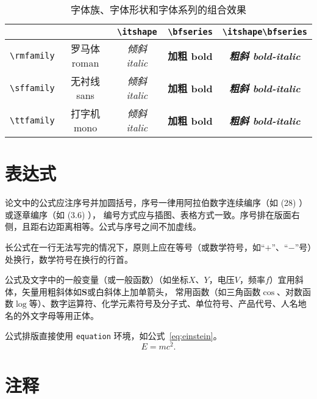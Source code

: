 \documentclass[fontset = mac ms]{seuthesis2024b}
\begin{document}
      \begin{table}[htbp]
        \caption{字体族、字体形状和字体系列的组合效果}
        \label{tab:font-effect}
        \begin{tabular}{ccccc}
          \toprule
          & & \verb|\itshape| & \verb|\bfseries| & \verb|\itshape\bfseries| \\
          \midrule
          \verb|\rmfamily| & \rmfamily 罗马体 roman & \rmfamily\itshape 倾斜 italic & \rmfamily\bfseries 加粗 bold & \rmfamily\itshape\bfseries 粗斜 bold-italic \\
          \verb|\sffamily| & \sffamily 无衬线 sans  & \sffamily\itshape 倾斜 italic & \sffamily\bfseries 加粗 bold & \sffamily\itshape\bfseries 粗斜 bold-italic \\
          \verb|\ttfamily| & \ttfamily 打字机 mono  & \ttfamily\itshape 倾斜 italic & \ttfamily\bfseries 加粗 bold & \ttfamily\itshape\bfseries 粗斜 bold-italic \\
          \bottomrule
        \end{tabular}
      \end{table}

    \section{表达式}

      论文中的公式应注序号并加圆括号，序号一律用阿拉伯数字连续编序（如 (28) ）或逐章编序（如 (3.6) ），
      编号方式应与插图、表格方式一致。序号排在版面右侧，且距右边距离相等。公式与序号之间不加虚线。

      长公式在一行无法写完的情况下，原则上应在等号（或数学符号，如“$+$”、“$-$”号）处换行，数学符号在换行的行首。

      公式及文字中的一般变量（或一般函数）（如坐标$X$、$Y$，电压$V$，频率$f$）宜用斜体，矢量用粗斜体如$\bm{S}$或白斜体上加单箭头，
      常用函数（如三角函数$\cos$、对数函数$\log$等）、数字运算符、化学元素符号及分子式、单位符号、产品代号、人名地名的外文字母等用正体。

      公式排版直接使用 \texttt{equation} 环境，如公式~\eqref{eq:einstein}。
      \begin{equation}\label{eq:einstein}
        E=mc^2.
      \end{equation}

    \section{注释}
\end{document}
